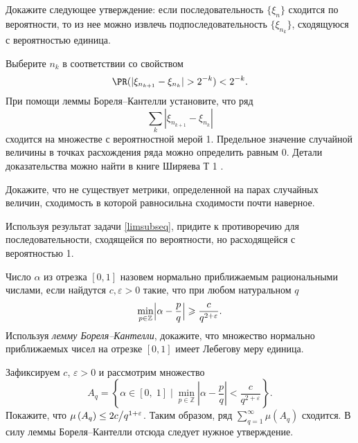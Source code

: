\begin{problem}
\label{limsubseq}
Докажите следующее утверждение: если последовательность $\{\xi_n\}$ сходится  по вероятности, то из нее можно извлечь подпоследовательность  $\{\xi_{n_k}\}$, сходящуюся с вероятностью единица.   
\end{problem}

\begin{ordre}
Выберите $n_k$ в соответствии со свойством
\[
\PR(|\xi_{n_{k+1}} - \xi_{n_k}| > 2^{-k}) < 2^{-k}. 
\]
При помощи леммы  Бореля--Кантелли установите, что ряд \[\sum_k |\xi_{n_{k+1}} - \xi_{n_k}| \] сходится на множестве с вероятностной мерой 1. Предельное значение случайной величины в точках расхождения ряда можно определить равным $0$.
Детали доказательства можно найти в книге Ширяева Т 1 \cite{21}. 
\end{ordre}


\begin{problem}\Star
\label{limpnnero}
Докажите, что не существует метрики, определенной на парах случайных величин, сходимость в которой равносильна сходимости почти наверное.
\end{problem}

\begin{ordre}
Используя результат задачи \ref{limsubseq}, придите к противоречию для последовательности, сходящейся по вероятности, но расходящейся с вероятностью 1. 
\end{ordre}

\begin{problem}
Число $\alpha$ из отрезка $[0, 1]$ назовем нормально приближаемым рациональными числами, если найдутся $c,\varepsilon>0$ такие, что 
при любом натуральном $q$ 
\begin{equation*}
\label{BorelKantel}
\min\limits_{p\in {\mathbb Z}} \Bigl|\alpha-\frac{p}{q} \Bigr|\geqslant \frac{c}{q^{2+\varepsilon}} . 
\end{equation*}
Используя \textit{лемму Бореля--Кантелли}, докажите, что множество нормально приближаемых чисел на отрезке $[0, 1]$ имеет Лебегову меру единица. 

\end{problem}
\begin{ordre}

Зафиксируем $c$, $\varepsilon >0$ и рассмотрим множество
\[A_{q} =\left\{\left. \alpha \in \left[0,\; 1\right]\; \right|\; \mathop{\min }\limits_{p\in {\mathbb Z}} \left|\alpha -\frac{p}{q} \right|<\frac{c}{q^{2+\varepsilon } } \right\}.\] 
Покажите, что $\mu \left(A_{q} \right)\le {2c\mathord{\left/ {\vphantom {2c q^{1+\varepsilon } }} \right. \kern-\nulldelimiterspace} q^{1+\varepsilon } } $. Таким образом, ряд $\sum_{q=1}^{\infty} \mu \left(A_{q} \right) $ сходится. В силу леммы Бореля--Кантелли отсюда следует нужное утверждение.

\end{ordre}

